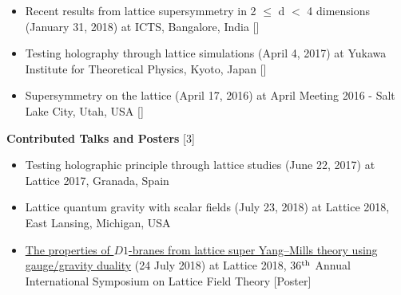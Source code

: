 \begin{itemize}
  
  \item Recent results from lattice supersymmetry in 2 $\le$ d $<$ 4 dimensions (January 31, 2018) at ICTS, Bangalore, India 
   [] 
  \vspace{1mm} 
  
 \item Testing holography through lattice simulations (April 4, 2017) at Yukawa Institute for Theoretical Physics, Kyoto, Japan
  []  
 \vspace{1mm} 
 
 
\item Supersymmetry on the lattice (April 17, 2016) at April Meeting 2016 - Salt Lake City, Utah, USA 
 [] 
\end{itemize}



\textcolor{alizarin}{\textbf{\fontsize{10}{38} \bfseries Contributed Talks and Posters} [3]}
\begin{itemize}
  \item Testing holographic principle through lattice studies (June 22, 2017) at Lattice 2017, Granada, Spain \vspace{1mm} 
  \item Lattice quantum gravity with scalar fields (July 23, 2018) at Lattice 2018, East Lansing, Michigan, USA   
  \item \href{https://indico.fnal.gov/event/15949/session/4/contribution/66}{The properties of $D1$-branes from lattice super Yang--Mills theory using gauge/gravity duality} (24 July 2018) 
 at Lattice 2018, 36$^{\rm{th}}$ Annual International Symposium on Lattice Field Theory [Poster] 
\end{itemize}
 
